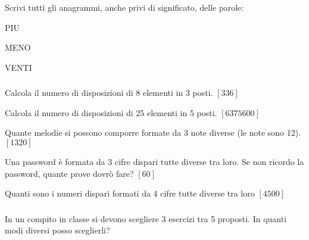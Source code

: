 \begin{esercizio}\label{P.3}
Scrivi tutti gli anagrammi, anche privi di significato, delle parole:
\begin{multicols}{3}
 \begin{enumeratea}
  \item PIU
  \item MENO
  \item VENTI
 \end{enumeratea}
 \end{multicols}
\end{esercizio}

\subsubsection*{}

\begin{esercizio}\label{D.1}
Calcola il numero di disposizioni di 8 elementi in 3 posti.
\hfill $\left[336\right]$
\end{esercizio}

\begin{esercizio}\label{D.2}
Calcola il numero di disposizioni di 25 elementi in 5 posti.
\hfill $\left[6375600\right]$
\end{esercizio}

\begin{esercizio}\label{D.3}
Quante melodie si possono comporre formate da 3 note diverse (le note sono 12).
\hfill $\left[1320\right]$
\end{esercizio}

\begin{esercizio}\label{D.4}
Una password è formata da 3 cifre dispari tutte diverse tra loro. Se non ricordo la password, quante prove dovrò fare?
\hfill $\left[60\right]$
\end{esercizio}

\begin{esercizio}\label{D.5}
Quanti sono i numeri dispari formati da 4 cifre tutte diverse tra loro
\hfill $\left[4500\right]$
\end{esercizio}

\subsubsection*{}

\begin{esercizio}
\label{ese:C.1}
In un compito in classe si devono scegliere 3 esercizi tra 5 proposti. In quanti modi diversi posso sceglierli?
\end{esercizio}

